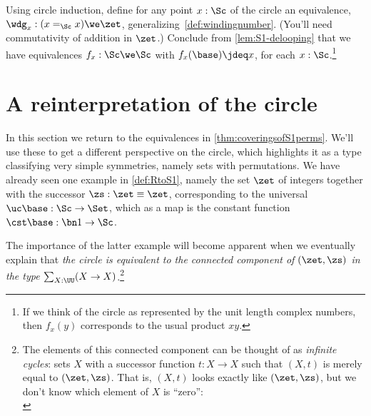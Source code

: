 \begin{xca}\label{xca:general-winding}
  Using circle induction, define for any point $x:\Sc$ of the circle
  an equivalence, $\wdg_x : (x =_\Sc x) \we \zet$,
  generalizing~\cref{def:windingnumber}.
  (You'll need commutativity of addition in $\zet$.)
  Conclude from \cref{lem:S1-delooping} that we have equivalences
  $f_x : \Sc \we \Sc$ with $f_x(\base) \jdeq x$, for each $x:\Sc$.\footnote{%
    If we think of the circle as represented by the unit length complex numbers,
    then $f_x(y)$ corresponds to the usual product $xy$.}
\end{xca}

\section{A reinterpretation of the circle}\label{sec:S1isC}

In this section we return to the equivalences in \cref{thm:coveringsofS1perms}.
We'll use these to get a different perspective on the circle,
which highlights it as a type classifying very simple symmetries,
namely sets with permutations.
We have already seen one example in \cref{def:RtoS1},
namely the set $\zet$ of integers together with the successor $\zs: \zet\equiv\zet$,
corresponding to the universal \covering $\uc\base:\Sc \to \Set$,
which as a map is the constant function $\cst\base : \bn 1 \to \Sc$.

The importance of the latter example will become apparent when we eventually
explain that \emph{the circle is equivalent to the connected component of
  $(\zet,\zs)$ in the type $\sum_{X:\UU}(X\to X)$}.\footnote{%
  The elements of this connected component can be thought of as
  \emph{infinite cycles}:
  sets $X$ with a successor function $t:X \to X$
  such that $(X,t)$ is merely equal to $(\zet,\zs)$.
  That is, $(X,t)$ looks exactly like $(\zet,\zs)$,
  but we don't know which element of $X$ is ``zero'':\\[1ex]
  }

